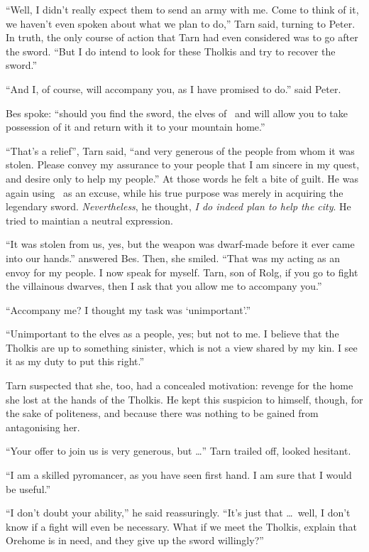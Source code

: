 ``Well, I didn't really expect them to send an army with me.  Come to think of it, we haven't even spoken about what we plan to do,'' Tarn said, turning to Peter.  In truth, the only course of action that Tarn had even considered was to go after the sword.  ``But I do intend to look for these Tholkis and try to recover the sword.''

``And I, of course, will accompany you, as I have promised to do.'' said Peter.

Bes spoke: ``should you find the sword, the elves of \inarthonor\ and \yedmurdim will allow you to take possession of it and return with it to your mountain home.''

``That's a relief'', Tarn said, ``and very generous of the people from whom it was stolen.  Please convey my assurance to your people that I am sincere in my quest, and desire only to help my people.''  At those words he felt a bite of guilt.  He was again using \korbarthrond\ as an excuse, while his true purpose was merely in acquiring the legendary sword.  \emph{Nevertheless}, he thought, \emph{I do indeed plan to help the city}.  He tried to maintian a neutral expression.

``It was stolen from us, yes, but the weapon was dwarf-made before it ever came into our hands.'' answered Bes.  Then, she smiled.  ``That was my acting as an envoy for my people.  I now speak for myself.  Tarn, son of Rolg, if you go to fight the villainous dwarves, then I ask that you allow me to accompany you.''

``Accompany me?  I thought my task was `unimportant'.''

``Unimportant to the elves as a people, yes; but not to me.  I believe that the Tholkis are up to something sinister, which is not a view shared by my kin.  I see it as my duty to put this right.''

Tarn suspected that she, too, had a concealed motivation: revenge for the home she lost at the hands of the Tholkis.  He kept this suspicion to himself, though, for the sake of politeness, and because there was nothing to be gained from antagonising her.

``Your offer to join us is very generous, but \ldots'' Tarn trailed off, looked hesitant.

``I am a skilled pyromancer, as you have seen first hand.  I am sure that I would be useful.''

``I don't doubt your ability,'' he said reassuringly.  ``It's just that \ldots\ well, I don't know if a fight will even be necessary.  What if we meet the Tholkis, explain that Orehome is in need, and they give up the sword willingly?''

